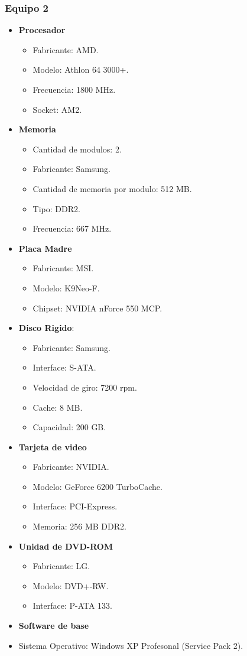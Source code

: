 \subsubsection{Equipo 2}
\begin{itemize}
\item \textbf{Procesador}
	\begin{itemize}
	\item Fabricante: AMD.	
	\item Modelo: Athlon 64 3000+.
	\item Frecuencia: 1800 MHz.
	\item Socket: AM2.
	\end{itemize}
\item \textbf{Memoria}
	\begin{itemize}
	\item Cantidad de modulos: 2.
	\item Fabricante: Samsung.
	\item Cantidad de memoria por modulo: 512 MB.
	\item Tipo: DDR2.
	\item Frecuencia: 667 MHz.
	\end{itemize}
\item \textbf{Placa Madre}
	\begin{itemize}
	\item Fabricante: MSI.	
	\item Modelo: K9Neo-F.
	\item Chipset: NVIDIA nForce 550 MCP.
	\end{itemize}
\item \textbf{Disco Rigido}:
	\begin{itemize}
	\item Fabricante: Samsung.	
	\item Interface: S-ATA.
	\item Velocidad de giro: 7200 rpm.
	\item Cache: 8 MB.
	\item Capacidad: 200 GB.
	\end{itemize}
\item \textbf{Tarjeta de video}
	\begin{itemize}
	\item Fabricante: NVIDIA.
	\item Modelo: GeForce 6200 TurboCache.
	\item Interface: PCI-Express.
	\item Memoria: 256 MB DDR2.
	\end{itemize}
\item \textbf{Unidad de DVD-ROM}
	\begin{itemize}
	\item Fabricante: LG.
	\item Modelo: DVD+-RW.
	\item Interface: P-ATA 133.
	\end{itemize}
\item \textbf{Software de base}
	\item Sistema Operativo: Windows XP Profesonal (Service Pack 2).
\end{itemize} 
